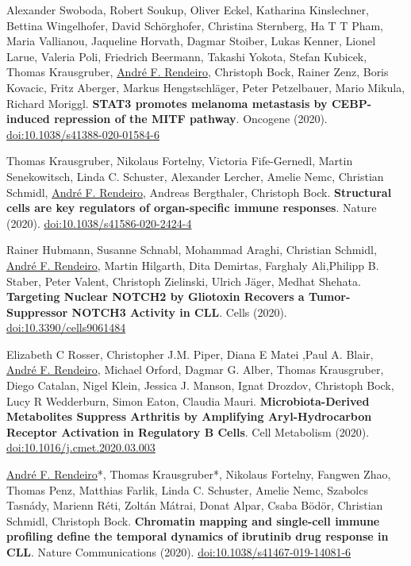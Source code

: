\documentclass[11pt,a4paper,roman]{moderncv} %
\begin{document}
\begin{etaremune}[leftmargin=1.0cm, itemindent=0pt, topsep=10pt, itemsep=2pt, partopsep=0pt, parsep=0pt]
        \item Alexander Swoboda, Robert Soukup, Oliver Eckel, Katharina Kinslechner, Bettina Wingelhofer, David Schörghofer, Christina Sternberg, Ha T T Pham, Maria Vallianou, Jaqueline Horvath, Dagmar Stoiber, Lukas Kenner, Lionel Larue, Valeria Poli, Friedrich Beermann, Takashi Yokota, Stefan Kubicek, Thomas Krausgruber, \underline{André F. Rendeiro}, Christoph Bock, Rainer Zenz, Boris Kovacic, Fritz Aberger, Markus Hengstschläger, Peter Petzelbauer, Mario Mikula, Richard Moriggl. \textbf{STAT3 promotes melanoma metastasis by CEBP-induced repression of the MITF pathway}. Oncogene (2020).
        \href{https://dx.doi.org/10.1038/s41388-020-01584-6}{doi:10.1038/s41388-020-01584-6}

        \item Thomas Krausgruber, Nikolaus Fortelny, Victoria Fife-Gernedl, Martin Senekowitsch, Linda C. Schuster, Alexander Lercher, Amelie Nemc, Christian Schmidl, \underline{André F. Rendeiro}, Andreas Bergthaler, Christoph Bock. \textbf{Structural cells are key regulators of organ-specific immune responses}. Nature (2020).
        \href{https://dx.doi.org/10.1038/s41586-020-2424-4}{doi:10.1038/s41586-020-2424-4}

        \item Rainer Hubmann, Susanne Schnabl, Mohammad Araghi, Christian Schmidl, \underline{André F. Rendeiro}, Martin Hilgarth, Dita Demirtas, Farghaly Ali,Philipp B. Staber, Peter Valent, Christoph Zielinski, Ulrich Jäger, Medhat Shehata. \textbf{Targeting Nuclear NOTCH2 by Gliotoxin Recovers a Tumor-Suppressor NOTCH3 Activity in CLL}. Cells (2020).
        \href{https://dx.doi.org/10.3390/cells9061484}{doi:10.3390/cells9061484}

        \item Elizabeth C Rosser, Christopher J.M. Piper, Diana E Matei ,Paul A. Blair, \underline{André F. Rendeiro}, Michael Orford, Dagmar G. Alber, Thomas Krausgruber, Diego Catalan, Nigel Klein, Jessica J. Manson, Ignat Drozdov, Christoph Bock, Lucy R Wedderburn, Simon Eaton, Claudia Mauri. \textbf{Microbiota-Derived Metabolites Suppress Arthritis by Amplifying Aryl-Hydrocarbon Receptor Activation in Regulatory B Cells}. Cell Metabolism (2020).
        \href{https://dx.doi.org/10.1016/j.cmet.2020.03.003}{doi:10.1016/j.cmet.2020.03.003}

        \item \underline{André F. Rendeiro}*, Thomas Krausgruber*, Nikolaus Fortelny, Fangwen Zhao, Thomas Penz, Matthias Farlik, Linda C. Schuster, Amelie Nemc, Szabolcs Tasnády, Marienn Réti, Zoltán Mátrai, Donat Alpar, Csaba Bödör, Christian Schmidl, Christoph Bock. \textbf{Chromatin mapping and single-cell immune profiling define the temporal dynamics of ibrutinib drug response in CLL}. Nature Communications (2020).
        \href{https://dx.doi.org/10.1038/s41467-019-14081-6}{doi:10.1038/s41467-019-14081-6}


\end{etaremune}
\end{document}
